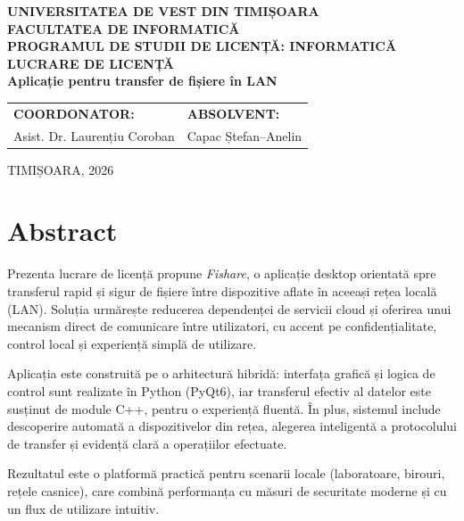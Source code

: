 \documentclass[12pt,a4paper]{report}
\begin{document}

\thispagestyle{empty}
\begin{center}
{\large \textbf{UNIVERSITATEA DE VEST DIN TIMIȘOARA}}\\[4pt]
{\large \textbf{FACULTATEA DE INFORMATICĂ}}\\[4pt]
{\large \textbf{PROGRAMUL DE STUDII DE LICENȚĂ: INFORMATICĂ }}\\[8em]

{\Huge \textbf{LUCRARE DE LICENȚĂ}}\\[4em]
{\LARGE \textbf{Aplicație pentru transfer de fișiere în LAN}}\\[10em]

\begin{tabular}{p{6cm}p{6cm}}
\textbf{COORDONATOR:} & \textbf{ABSOLVENT:}\\
Asist. Dr. Laurențiu Coroban & Capac Ștefan--Anelin
\end{tabular}

\vfill
{\large TIMIȘOARA, 2026}
\end{center}

\newpage


\section*{Abstract}

Prezenta lucrare de licență propune \textit{Fishare}, o aplicație desktop orientată spre transferul rapid și sigur de fișiere între dispozitive aflate în aceeași rețea locală (LAN). Soluția urmărește reducerea dependenței de servicii cloud și oferirea unui mecanism direct de comunicare între utilizatori, cu accent pe confidențialitate, control local și experiență simplă de utilizare.

Aplicația este construită pe o arhitectură hibridă: interfața grafică și logica de control sunt realizate în Python (PyQt6), iar transferul efectiv al datelor este susținut de module C++, pentru o experiență fluentă. În plus, sistemul include descoperire automată a dispozitivelor din rețea, alegerea inteligentă a protocolului de transfer și evidență clară a operațiilor efectuate.

Rezultatul este o platformă practică pentru scenarii locale (laboratoare, birouri, rețele casnice), care combină performanța cu măsuri de securitate moderne și cu un flux de utilizare intuitiv.
\end{document}
